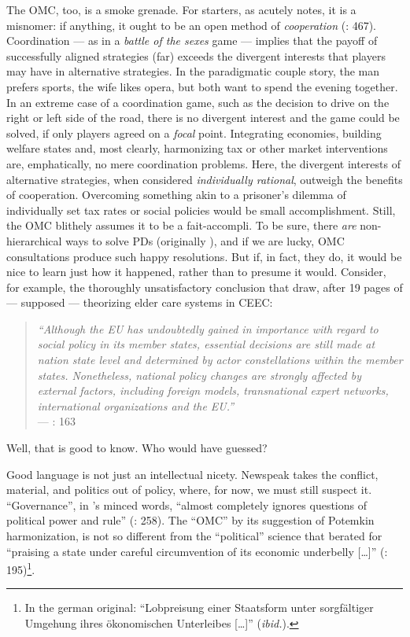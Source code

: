 The \gls{OMC}, too, is a smoke grenade. For starters, as \citeauthor{Offe2003} acutely notes, it is a misnomer: if anything, it ought to be an open method of \emph{cooperation} (\citeyear{Offe2003}: 467). Coordination --- as in a \emph{battle of the sexes} game --- implies that the payoff of successfully aligned strategies (far) exceeds the divergent interests that players may have in alternative strategies. In the paradigmatic couple story, the man prefers sports, the wife likes opera, but both want to spend the evening together. In an extreme case of a coordination game, such as the decision to drive on the right or left side of the road, there is no divergent interest and the game could be solved, if only players agreed on a \emph{focal} point. Integrating economies, building welfare states and, most clearly, harmonizing tax or other market interventions are, emphatically, no mere coordination problems. Here, the divergent interests of alternative strategies, when considered \emph{individually rational}, outweigh the benefits of cooperation. Overcoming something akin to a prisoner's dilemma of individually set tax rates or social policies would be small accomplishment. Still, the \gls{OMC} blithely assumes it to be a fait-accompli. To be sure, there \emph{are} non-hierarchical ways to solve \glspl{PD} (originally \citealt{Axelrod1980}), and if we are lucky, \gls{OMC} consultations produce such happy resolutions. But if, in fact, they do, it would be nice to learn just how it happened, rather than to presume it would. 
Consider, for example, the thoroughly unsatisfactory conclusion that \citeauthor{Theobald2009} draw, after 19 pages of --- supposed --- theorizing elder care systems in \gls{CEEC}:
\begin{quote}
	\emph{``Although the \gls{EU} has undoubtedly gained in importance with regard to social policy in its member states, essential decisions are still made at nation state level and determined by actor constellations within the member states.
	Nonetheless, national policy changes are strongly affected by external factors, including foreign models, transnational expert networks, international organizations and the \gls{EU}.''}\\
	--- \citeyear{Theobald2009}: 163
\end{quote}
Well, that is good to know. Who would have guessed?

Good language is not just an intellectual nicety. Newspeak takes the conflict, material, and politics out of policy, where, for now, we must still suspect it. ``Governance'', in \citeauthor{Jachtenfuchs2001}'s minced words, ``almost completely ignores questions of political power and rule'' (\citeyear{Jachtenfuchs2001}: 258). The ``\gls{OMC}'' by its suggestion of Potemkin harmonization, is not so different from the ``political'' science that \cite{Agnoli-1989-aa} berated for ``praising a state under careful circumvention of its economic underbelly [\ldots]'' (\citeyear{Agnoli-1989-aa}: 195)\footnote{
	In the german original: ``Lobpreisung einer Staatsform unter sorgf\"{a}ltiger Umgehung ihres \"{o}konomischen Unterleibes [\ldots]'' (\emph{ibid.}).}.

